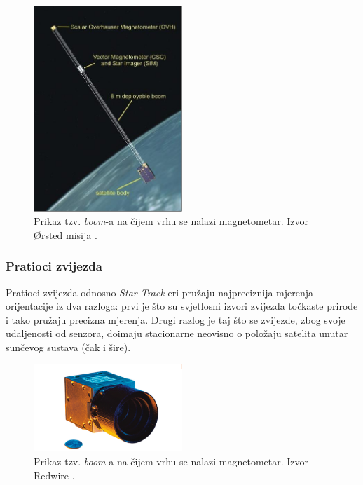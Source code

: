 \documentclass[times, utf8, diplomski, numeric]{templates/template}
\begin{document}
{{{{                \begin{figure}[htb]
                \centering
                \includegraphics[width=0.5\textwidth]{images/boom.jpg}
                \caption{Prikaz tzv. \emph{boom}-a na čijem vrhu se nalazi magnetometar. Izvor Ørsted misija \cite{boomCite}.}
                \label{fig:boom}
                \end{figure}
            }

            \subsubsection{Pratioci zvijezda }{
                Pratioci zvijezda odnosno \emph{Star Track}-eri pružaju najpreciznija mjerenja orijentacije iz dva razloga: prvi je što su svjetlosni izvori zvijezda točkaste prirode i tako pružaju precizna mjerenja. Drugi razlog je taj što se zvijezde, zbog svoje udaljenosti od senzora, doimaju stacionarne neovisno o položaju satelita unutar sunčevog sustava (čak i šire).

                \begin{figure}[htb]
                \centering
                \includegraphics[width=0.5\textwidth]{images/star_tracker.png}
                \caption{Prikaz tzv. \emph{boom}-a na čijem vrhu se nalazi magnetometar. Izvor Redwire \cite{starTrackerCite}.}
                \label{fig:star_tracker}
                \end{figure}

}}}}
\end{document}
